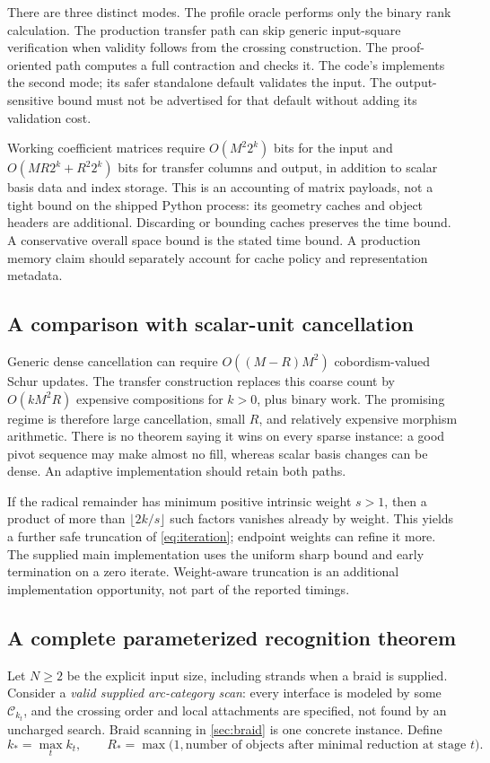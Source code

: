 \documentclass[11pt,letterpaper]{article}
\theoremstyle{definition}
\theoremstyle{remark}
\newcommand{\C}{\mathcal C}
\newcommand{\code}[1]{\texttt{\detokenize{#1}}}
\begin{document}
There are three distinct modes. The profile oracle performs only the binary
rank calculation. The production transfer path can skip generic input-square
verification when validity follows from the crossing construction. The
proof-oriented path computes a full contraction and checks it. The code's
\code{transfer(..., validate=False)} implements the second mode; its safer
standalone default validates the input. The output-sensitive bound must not be
advertised for that default without adding its validation cost.

Working coefficient matrices require $O(M^2 2^k)$ bits for the input and
$O(MR2^k+R^2 2^k)$ bits for transfer columns and output, in addition to scalar
basis data and index storage. This is an accounting of matrix payloads, not a
tight bound on the shipped Python process: its geometry caches and object
headers are additional. Discarding or bounding caches preserves the time bound.
A conservative overall space bound is the stated time bound. A production
memory claim should separately account for cache policy and representation
metadata.

\subsection{A comparison with scalar-unit cancellation}
Generic dense cancellation can require $O((M-R)M^2)$ cobordism-valued Schur
updates. The transfer construction replaces this coarse count by
$O(kM^2R)$ expensive compositions for $k>0$, plus binary work. The promising
regime is therefore large cancellation, small $R$, and relatively expensive
morphism arithmetic. There is no theorem saying it wins on every sparse
instance: a good pivot sequence may make almost no fill, whereas scalar basis
changes can be dense. An adaptive implementation should retain both paths.

If the radical remainder has minimum positive intrinsic weight $s>1$, then a
product of more than $\lfloor2k/s\rfloor$ such factors vanishes already by
weight. This yields a further safe truncation of \cref{eq:iteration}; endpoint
weights can refine it more. The supplied main implementation uses the uniform
sharp bound and early termination on a zero iterate. Weight-aware truncation
is an additional implementation opportunity, not part of the reported timings.

\subsection{A complete parameterized recognition theorem}
Let $N\geq2$ be the explicit input size, including strands when a braid is
supplied. Consider a \emph{valid supplied arc-category scan}: every interface
is modeled by some $\C_{k_t}$, and the crossing order and local attachments
are specified, not found by an uncharged search. Braid scanning in
\cref{sec:braid} is one concrete instance. Define
\begin{equation}\label{eq:parameters}
 k_* = \max_t k_t,\qquad
 R_* = \max\bigl(1,\text{number of objects after minimal reduction at stage }t\bigr).
\end{equation}
\end{document}
